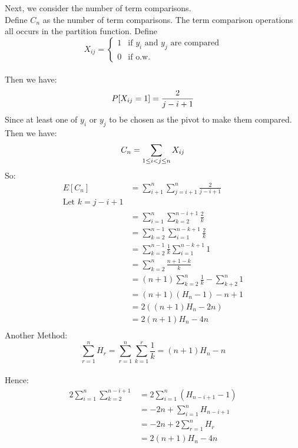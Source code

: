 \documentclass{article}
\newcommand{\twopartdef}[4]
{
  \left\{
  \begin{array}{ll}
    #1 & \mbox{if } #2 \\
    #3 & \mbox{if } #4
  \end{array}
  \right.
}
\begin{document}
Next, we consider the number of term comparisons.\\
Define $C_n$ as the number of term comparisons. The term comparison
operations all occurs in the partition function. Define\\
\[
X_{ij} = \twopartdef{1}{\text{$y_i$ and $y_j$ are compared}}{0}{\text{o.w.}}
\]
\\
Then we have:\\
\[
P[X_{ij}=1]=\frac{2}{j-i+1}\\
\]
Since at least one of $y_i$ or $y_j$ to be chosen as the pivot to make
them compared.\\ %
Then we have:\\
\[
C_n=\sum_{1\leq i<j\leq n} X_{ij}\\
\]
So:\\
\begin{align*}
E[C_n]&=\sum_{i+1}^n\sum_{j=i+1}^n\frac{2}{j-i+1}\\
\text{Let $k=j-i+1$}\\
&=\sum_{i=1}^n\sum_{k=2}^{n-i+1}\frac{2}{k}\\
&=\sum_{k=2}^{n-1}\sum_{i=1}^{n-k+1}\frac{2}{k}\\
&=\sum_{k=2}^{n-1}\frac{1}{k}\sum_{i=1}^{n-k+1}1\\ %
&=\sum_{k=2}^n\frac{n+1-k}{k}\\
&=(n+1)\sum_{k=2}^n\frac{1}{k}-\sum_{k+2}^n1\\
&=(n+1)(H_n-1)-n+1\\
&=2((n+1)H_n-2n)\\
&=2(n+1)H_n-4n\\
\end{align*}
Another Method:\\
\[\sum_{r=1}^nH_r=\sum_{r=1}^n\sum_{k=1}^r\frac{1}{k}=(n+1)H_n-n\]\\
Hence:\\
\begin{align*}
2\sum_{i=1}^n\sum_{k=2}^{n-i+1}&=2\sum_{i=1}^n(H_{n-i+1}-1)\\
&=-2n+\sum_{i=1}^nH_{n-i+1}\\
&=-2n+2\sum_{r=1}^nH_r\\
&=2(n+1)H_n-4n\\
\end{align*}
\end{document}
